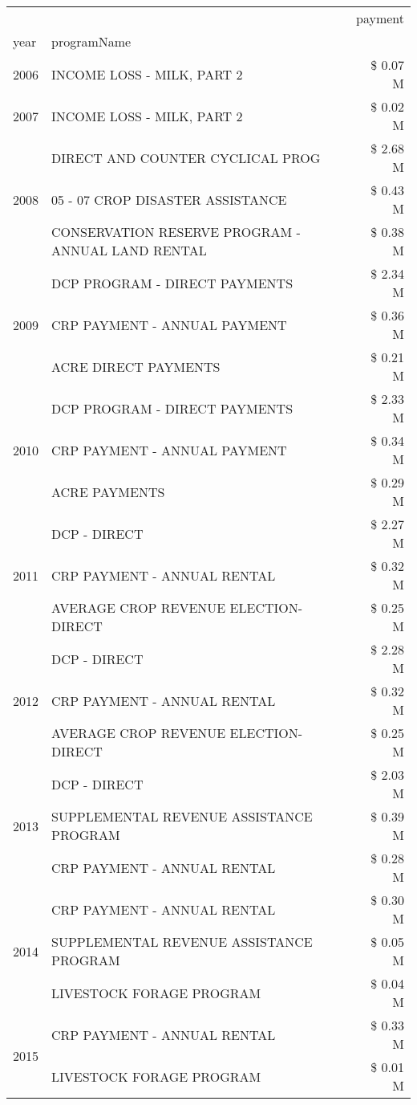 \begin{tabular}{llr}
\toprule
 &  & payment \\
year & programName &  \\
\midrule
2006 & INCOME LOSS - MILK, PART 2 & \$ 0.07 M \\
\cline{1-3}
2007 & INCOME LOSS - MILK, PART 2 & \$ 0.02 M \\
\cline{1-3}
\multirow[t]{3}{*}{2008} & DIRECT AND COUNTER CYCLICAL PROG & \$ 2.68 M \\
 & 05 - 07 CROP DISASTER ASSISTANCE & \$ 0.43 M \\
 & CONSERVATION RESERVE PROGRAM - ANNUAL LAND RENTAL & \$ 0.38 M \\
\cline{1-3}
\multirow[t]{3}{*}{2009} & DCP PROGRAM - DIRECT PAYMENTS & \$ 2.34 M \\
 & CRP PAYMENT - ANNUAL PAYMENT & \$ 0.36 M \\
 & ACRE DIRECT PAYMENTS & \$ 0.21 M \\
\cline{1-3}
\multirow[t]{3}{*}{2010} & DCP PROGRAM - DIRECT PAYMENTS & \$ 2.33 M \\
 & CRP PAYMENT - ANNUAL PAYMENT & \$ 0.34 M \\
 & ACRE PAYMENTS & \$ 0.29 M \\
\cline{1-3}
\multirow[t]{3}{*}{2011} & DCP - DIRECT & \$ 2.27 M \\
 & CRP PAYMENT - ANNUAL RENTAL & \$ 0.32 M \\
 & AVERAGE CROP REVENUE ELECTION-DIRECT & \$ 0.25 M \\
\cline{1-3}
\multirow[t]{3}{*}{2012} & DCP - DIRECT & \$ 2.28 M \\
 & CRP PAYMENT - ANNUAL RENTAL & \$ 0.32 M \\
 & AVERAGE CROP REVENUE ELECTION-DIRECT & \$ 0.25 M \\
\cline{1-3}
\multirow[t]{3}{*}{2013} & DCP - DIRECT & \$ 2.03 M \\
 & SUPPLEMENTAL REVENUE ASSISTANCE PROGRAM & \$ 0.39 M \\
 & CRP PAYMENT - ANNUAL RENTAL & \$ 0.28 M \\
\cline{1-3}
\multirow[t]{3}{*}{2014} & CRP PAYMENT - ANNUAL RENTAL & \$ 0.30 M \\
 & SUPPLEMENTAL REVENUE ASSISTANCE PROGRAM & \$ 0.05 M \\
 & LIVESTOCK FORAGE PROGRAM & \$ 0.04 M \\
\cline{1-3}
\multirow[t]{3}{*}{2015} & CRP PAYMENT - ANNUAL RENTAL & \$ 0.33 M \\
 & LIVESTOCK FORAGE PROGRAM & \$ 0.01 M \\

\end{tabular}

